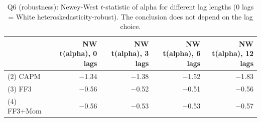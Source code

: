\begin{table}[!htbp]
\centering
\small
\caption{Q6 (robustness): Newey-West $t$-statistic of alpha for different lag lengths (0 lags = White heteroskedasticity-robust). The conclusion does not depend on the lag choice.}
\label{tab:q6b}
\begin{tabular}{lrrrr}
\toprule
 & NW t(alpha), 0 lags & NW t(alpha), 3 lags & NW t(alpha), 6 lags & NW t(alpha), 12 lags \\
\midrule
(2) CAPM & $-$1.34 & $-$1.38 & $-$1.52 & $-$1.83 \\
(3) FF3 & $-$0.56 & $-$0.52 & $-$0.51 & $-$0.56 \\
(4) FF3+Mom & $-$0.56 & $-$0.53 & $-$0.53 & $-$0.57 \\
\bottomrule
\end{tabular}
\end{table}
